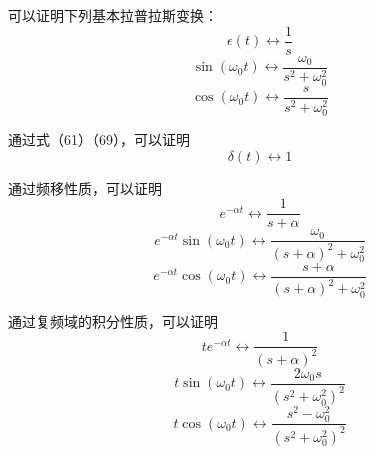 \documentclass[UTF8,a4paper,11pt]{article}
\begin{document}
可以证明下列基本拉普拉斯变换：
\begin{equation}
\epsilon(t)\leftrightarrow \frac{1}{s}
\end{equation}
\begin{equation}
\sin(\omega_0t)\leftrightarrow \frac{\omega_0}{s^2+\omega_0^2}
\end{equation}
\begin{equation}
\cos(\omega_0t)\leftrightarrow \frac{s}{s^2+\omega_0^2}
\end{equation}

通过式（61）（69），可以证明
\begin{equation}
\delta(t)\leftrightarrow 1
\end{equation}

通过频移性质，可以证明
\begin{equation}
e^{-\alpha t}\leftrightarrow \frac{1}{s+\alpha}
\end{equation}
\begin{equation}
e^{-\alpha t}\sin(\omega_0t)\leftrightarrow \frac{\omega_0}{(s+\alpha)^2+\omega_0^2}
\end{equation}
\begin{equation}
e^{-\alpha t}\cos(\omega_0t)\leftrightarrow \frac{s+\alpha}{(s+\alpha)^2+\omega_0^2}
\end{equation}

通过复频域的积分性质，可以证明
\begin{equation}
te^{-\alpha t}\leftrightarrow \frac{1}{(s+\alpha)^2}
\end{equation}
\begin{equation}
t\sin(\omega_0t)\leftrightarrow \frac{2\omega_0s}{(s^2+\omega_0^2)^2}
\end{equation}
\begin{equation}
t\cos(\omega_0t)\leftrightarrow \frac{s^2-\omega_0^2}{(s^2+\omega_0^2)^2}
\end{equation}
\end{document}
